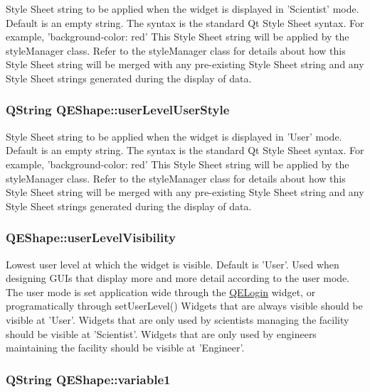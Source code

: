 \label{classQEShape_aa71e87349e8754ca870dac8509563ffd}
Style Sheet string to be applied when the widget is displayed in 'Scientist' mode. Default is an empty string. The syntax is the standard Qt Style Sheet syntax. For example, 'background-\/color: red' This Style Sheet string will be applied by the styleManager class. Refer to the styleManager class for details about how this Style Sheet string will be merged with any pre-\/existing Style Sheet string and any Style Sheet strings generated during the display of data. \hypertarget{classQEShape_a47d835d06b0143a10a414e706fb3c37f}{
\subsubsection[{userLevelUserStyle}]{\setlength{\rightskip}{0pt plus 5cm}QString QEShape::userLevelUserStyle}}
\label{classQEShape_a47d835d06b0143a10a414e706fb3c37f}
Style Sheet string to be applied when the widget is displayed in 'User' mode. Default is an empty string. The syntax is the standard Qt Style Sheet syntax. For example, 'background-\/color: red' This Style Sheet string will be applied by the styleManager class. Refer to the styleManager class for details about how this Style Sheet string will be merged with any pre-\/existing Style Sheet string and any Style Sheet strings generated during the display of data. \hypertarget{classQEShape_aa02618ef4969857af73b0fc5278e2104}{
\subsubsection[{userLevelVisibility}]{ QEShape::userLevelVisibility}}
\label{classQEShape_aa02618ef4969857af73b0fc5278e2104}
Lowest user level at which the widget is visible. Default is 'User'. Used when designing GUIs that display more and more detail according to the user mode. The user mode is set application wide through the \hyperlink{classQELogin}{QELogin} widget, or programatically through setUserLevel() Widgets that are always visible should be visible at 'User'. Widgets that are only used by scientists managing the facility should be visible at 'Scientist'. Widgets that are only used by engineers maintaining the facility should be visible at 'Engineer'. \hypertarget{classQEShape_ab5e680419c4f3586303ac436241fac79}{
\subsubsection[{variable1}]{\setlength{\rightskip}{0pt plus 5cm}QString QEShape::variable1}}
